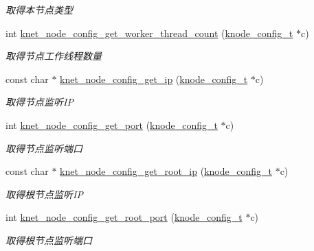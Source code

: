 \begin{DoxyCompactItemize}
\begin{DoxyCompactList}\small\item\em 取得本节点类型 \end{DoxyCompactList}\item 
int \hyperlink{a00105_a5f9dfba4c949d8f973f9561a6c271916_a5f9dfba4c949d8f973f9561a6c271916}{knet\+\_\+node\+\_\+config\+\_\+get\+\_\+worker\+\_\+thread\+\_\+count} (\hyperlink{a00066_af1cfaee0eb1c76ebf06076b95cc47ee1_af1cfaee0eb1c76ebf06076b95cc47ee1}{knode\+\_\+config\+\_\+t} $\ast$c)
\begin{DoxyCompactList}\small\item\em 取得节点工作线程数量 \end{DoxyCompactList}\item 
const char $\ast$ \hyperlink{a00105_ae3872a2f2a42a36c171e5e54897193b4_ae3872a2f2a42a36c171e5e54897193b4}{knet\+\_\+node\+\_\+config\+\_\+get\+\_\+ip} (\hyperlink{a00066_af1cfaee0eb1c76ebf06076b95cc47ee1_af1cfaee0eb1c76ebf06076b95cc47ee1}{knode\+\_\+config\+\_\+t} $\ast$c)
\begin{DoxyCompactList}\small\item\em 取得节点监听\+I\+P \end{DoxyCompactList}\item 
int \hyperlink{a00105_a4d6d40da8a651fcb5fff10b84c61ccb5_a4d6d40da8a651fcb5fff10b84c61ccb5}{knet\+\_\+node\+\_\+config\+\_\+get\+\_\+port} (\hyperlink{a00066_af1cfaee0eb1c76ebf06076b95cc47ee1_af1cfaee0eb1c76ebf06076b95cc47ee1}{knode\+\_\+config\+\_\+t} $\ast$c)
\begin{DoxyCompactList}\small\item\em 取得节点监听端口 \end{DoxyCompactList}\item 
const char $\ast$ \hyperlink{a00105_a529df491163ba265d6fc9b2d2d0b199d_a529df491163ba265d6fc9b2d2d0b199d}{knet\+\_\+node\+\_\+config\+\_\+get\+\_\+root\+\_\+ip} (\hyperlink{a00066_af1cfaee0eb1c76ebf06076b95cc47ee1_af1cfaee0eb1c76ebf06076b95cc47ee1}{knode\+\_\+config\+\_\+t} $\ast$c)
\begin{DoxyCompactList}\small\item\em 取得根节点监听\+I\+P \end{DoxyCompactList}\item 
int \hyperlink{a00105_a92a289991e2f79d472118d15153231b3_a92a289991e2f79d472118d15153231b3}{knet\+\_\+node\+\_\+config\+\_\+get\+\_\+root\+\_\+port} (\hyperlink{a00066_af1cfaee0eb1c76ebf06076b95cc47ee1_af1cfaee0eb1c76ebf06076b95cc47ee1}{knode\+\_\+config\+\_\+t} $\ast$c)
\begin{DoxyCompactList}\small\item\em 取得根节点监听端口 \end{DoxyCompactList}\item 

\end{DoxyCompactItemize}
